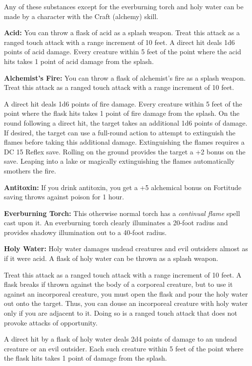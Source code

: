 \begin{multicols}{2}
Any of these substances except for the everburning torch and holy water can be 
made by a character with the Craft (alchemy) skill.

\textbf{Acid:} You can throw a flask of acid as a splash weapon. Treat this attack 
as a ranged touch attack with a range increment of 10 feet. A direct hit deals 
1d6 points of acid damage. Every creature within 5 feet of the point where the 
acid hits takes 1 point of acid damage from the splash.

\textbf{Alchemist's Fire:} You can throw a flask of alchemist's fire as a splash 
weapon. Treat this attack as a ranged touch attack with a range increment of 10 
feet.

A direct hit deals 1d6 points of fire damage. Every creature within 5 feet of the 
point where the flask hits takes 1 point of fire damage from the splash. On the 
round following a direct hit, the target takes an additional 1d6 points of damage. 
If desired, the target can use a full-round action to attempt to extinguish the 
flames before taking this additional damage. Extinguishing the flames requires 
a DC 15 Reflex save. Rolling on the ground provides the target a +2 bonus on the 
save. Leaping into a lake or magically extinguishing the flames automatically smothers 
the fire.

\textbf{Antitoxin:} If you drink antitoxin, you get a +5 alchemical bonus on Fortitude 
saving throws against poison for 1 hour.

\textbf{Everburning Torch:} This otherwise normal torch has a \textit{continual 
flame }spell cast upon it. An everburning torch clearly illuminates a 20-foot radius 
and provides shadowy illumination out to a 40-foot radius.

\textbf{Holy Water:} Holy water damages undead creatures and evil outsiders almost 
as if it were acid. A flask of holy water can be thrown as a splash weapon.

Treat this attack as a ranged touch attack with a range increment of 10 feet. A 
flask breaks if thrown against the body of a corporeal creature, but to use it 
against an incorporeal creature, you must open the flask and pour the holy water 
out onto the target. Thus, you can douse an incorporeal creature with holy water 
only if you are adjacent to it. Doing so is a ranged touch attack that does not 
provoke attacks of opportunity.

A direct hit by a flask of holy water deals 2d4 points of damage to an undead creature 
or an evil outsider. Each such creature within 5 feet of the point where the flask 
hits takes 1 point of damage from the splash.


\end{multicols}
